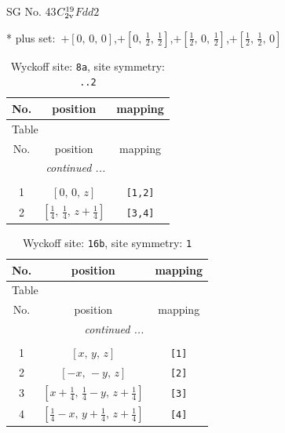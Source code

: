 \documentclass[fleqn,8pt]{jsarticle}
\begin{document}
\setcounter{MaxMatrixCols}{32}

\renewcommand{\tablename}{Table~}
\renewcommand{\figurename}{Figure~}
\begin{center}
\LARGE
SG No. 43\quad$C_{\rm 2v}^{19}$\quad$Fdd2$\quad[ orthorhombic ]
\end{center}
* plus set:\,\,\,$+\left[ 0,\, 0,\, 0 \right]$,\quad $+\left[ 0,\, \frac{1}{2},\, \frac{1}{2} \right]$,\quad $+\left[ \frac{1}{2},\, 0,\, \frac{1}{2} \right]$,\quad $+\left[ \frac{1}{2},\, \frac{1}{2},\, 0 \right]$
\renewcommand{\arraystretch}{1.2}
\begin{longtable}{ccc}
\caption{Wyckoff site: {\tt 8a}, site symmetry: {\tt ..2}}
 \\
 \hline \hline
No. & position & mapping \\ \hline \endfirsthead

\multicolumn{2}{l}{\tablename\ \thetable{}} \\
 \hline \hline
No. & position & mapping \\ \hline \endhead

 \hline \hline
\multicolumn{2}{r}{\footnotesize\it continued ...} \\ \endfoot

 \hline \hline
\multicolumn{2}{r}{} \\ \endlastfoot

1 & $\left[ 0,\, 0,\, z \right]$ & {\tt [1,2]} \\ \hline
2 & $\left[ \frac{1}{4},\, \frac{1}{4},\, z + \frac{1}{4} \right]$ & {\tt [3,4]} \\
\end{longtable}
\renewcommand{\arraystretch}{1.2}
\begin{longtable}{ccc}
\caption{Wyckoff site: {\tt 16b}, site symmetry: {\tt 1}}
 \\
 \hline \hline
No. & position & mapping \\ \hline \endfirsthead

\multicolumn{2}{l}{\tablename\ \thetable{}} \\
 \hline \hline
No. & position & mapping \\ \hline \endhead

 \hline \hline
\multicolumn{2}{r}{\footnotesize\it continued ...} \\ \endfoot

 \hline \hline
\multicolumn{2}{r}{} \\ \endlastfoot

1 & $\left[ x,\, y,\, z \right]$ & {\tt [1]} \\ \hline
2 & $\left[ - x,\, - y,\, z \right]$ & {\tt [2]} \\ \hline
3 & $\left[ x + \frac{1}{4},\, \frac{1}{4} - y,\, z + \frac{1}{4} \right]$ & {\tt [3]} \\ \hline
4 & $\left[ \frac{1}{4} - x,\, y + \frac{1}{4},\, z + \frac{1}{4} \right]$ & {\tt [4]} \\
\end{longtable}
\end{document}
